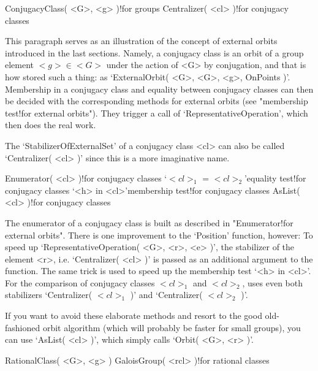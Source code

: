 \null

\>ConjugacyClass( <G>, <g> )!{for groups}
\>Centralizer( <cl> )!{for conjugacy classes}

This paragraph  serves  as an illustration  of  the  concept  of external
orbits introduced in  the last sections. Namely,  a conjugacy class is an
orbit  of a   group  element $<g>\in  <G>$  under  the action  of <G>  by
conjugation,  and   that  is  how    {\GAP}  stored such    a  thing:  as
`ExternalOrbit(  <G>,  <G>, <g>, OnPoints  )'.  Membership in a conjugacy
class and equality between conjugacy classes can then be decided with the
corresponding   methods for  external  orbits   (see "membership test!for
external orbits").  They trigger   a call  of  `RepresentativeOperation',
which then does the real work.

The  `StabilizerOfExternalSet' of  a   conjugacy class <cl>  can also  be
called `Centralizer( <cl> )' since this is a more imaginative name.

\>Enumerator( <cl> )!{for conjugacy classes}
\>`$<cl>_1$ = $<cl>_2$'{equality test}!{for conjugacy classes}
\>`<h> in <cl>'{membership test}!{for conjugacy classes}
\>AsList( <cl> )!{for conjugacy classes}

The  enumerator  of  a    conjugacy class  is  built  as     described in
"Enumerator!for  external orbits".  There   is  one  improvement  to  the
`Position' function,  however: To speed up `RepresentativeOperation( <G>,
<r>, <e>  )', the stabilizer of  the element <r>, i.e. `Centralizer( <cl>
)' is passed as an additional argument to the function. The same trick is
used to speed up the membership test `<h> in <cl>'. For the comparison of
conjugacy  classes  $<cl>_1$ and   $<cl>_2$,    {\GAP}  uses even    both
stabilizers `Centralizer( $<cl>_1$ )' and `Centralizer( $<cl>_2$ )'.

If   you want to avoid these   elaborate methods and  resort  to the good
old-fashioned orbit  algorithm (which will  probably  be faster for small
groups), you can  use `AsList( <cl>  )', which simply calls `Orbit(  <G>,
<r> )'.

\null

\>RationalClass( <G>, <g> )
\>GaloisGroup( <rcl> )!{for rational classes}


